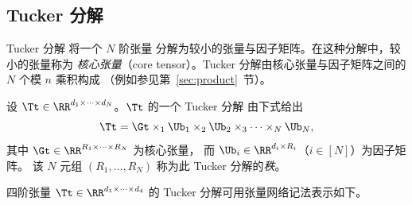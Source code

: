 
\subsection{Tucker 分解}
Tucker 分解 \cite{tucker1966some} 将一个 $N$ 阶张量
分解为较小的张量与因子矩阵。在这种分解中，较小的张量称为
\emph{核心张量}（core tensor）。Tucker 分解由核心张量与因子矩阵之间的
$N$ 个模 $n$ 乘积构成
（例如参见第~\ref{sec:product}~节）。

设 $\Tt \in \RR^{d_1 \times \dots \times d_N}$。$\Tt$ 的一个 Tucker 分解
由下式给出
\[
    \Tt
    = \Gt \times_1 \Ub_1 \times_2 \Ub_2\times_3 \dots \times_N \Ub_N,
\]
其中 $\Gt \in \RR^{R_1 \times \dots \times R_N}$ 为核心张量，
而 $\Ub_i \in \RR^{d_i \times R_i}$（$i \in [N]$）为因子矩阵。
该 $N$ 元组 $(R_1,\dots,R_N)$ 称为此 Tucker
分解的\emph{秩}。

四阶张量 $\Tt\in\RR^{d_1\times\cdots \times d_4}$ 的 Tucker 分解可用张量网络记法表示如下。
